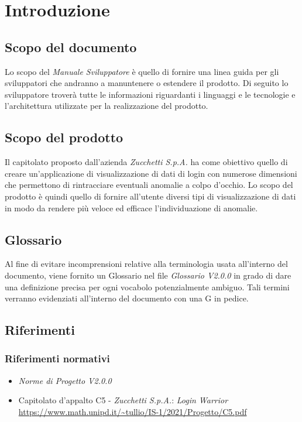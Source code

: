 \chapter{Introduzione}

\section{Scopo del documento}
Lo scopo del \textit{Manuale Sviluppatore} è quello di fornire una linea guida per gli sviluppatori che andranno a manuntenere o estendere il prodotto. Di seguito lo sviluppatore troverà tutte le informazioni riguardanti i linguaggi e le tecnologie e l'architettura utilizzate per la realizzazione del prodotto.

\section{Scopo del prodotto}
Il capitolato proposto dall'azienda \textit{Zucchetti S.p.A.} ha come obiettivo quello di creare un'applicazione di visualizzazione di dati di login con numerose dimensioni che permettono
di rintracciare eventuali anomalie a colpo d'occhio. Lo scopo del prodotto è quindi quello di fornire all'utente diversi tipi di visualizzazione di dati in modo da rendere
più veloce ed efficace l'individuazione di anomalie.

\section{Glossario}
Al fine di evitare incomprensioni relative alla terminologia usata all'interno del documento, viene fornito un Glossario nel file \textit{Glossario V2.0.0} in grado di dare una definizione precisa per ogni vocabolo potenzialmente ambiguo. Tali termini verranno evidenziati all'interno del documento con una G in pedice.

\section{Riferimenti}
\subsection{Riferimenti normativi}
\begin{itemize}
    \item \textit{Norme di Progetto V2.0.0}
    \item Capitolato d'appalto C5 - \textit{Zucchetti S.p.A.}: \textit{Login Warrior} \\
    \url{https://www.math.unipd.it/~tullio/IS-1/2021/Progetto/C5.pdf}
\end{itemize}


